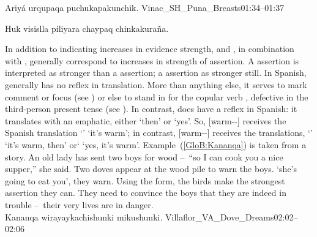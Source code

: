 %
{Ariyá urqupaqa puchukapakunchik.}%
{}%
{Vinac\_SH\_Puna\_Breasts}{01:34--01:37}%

%
{Huk visislla piliyara chaypaq chinkakuraña.}%
{}%
{}{}%

In addition to indicating increases in evidence strength,  and , in combination with , generally correspond to increases in strength of assertion. A  assertion is interpreted as stronger than a  assertion; a  assertion as stronger still. In Spanish,  generally has no reflex in translation. More than anything else, it serves to mark comment or focus (see ) or else to stand in for the copular verb , defective in the third-person present tense (see ). In contrast,  does have a reflex in Spanish: it translates with an emphatic, either  ‘then’ or  ‘yes’. So,  [warm--\uo{}] receives the Spanish translation ‘’ ‘it’s warm’; in contrast,  [warm--] receives the translations, ‘’ ‘it’s warm, then’ or‘ ‘yes, it’s warm’. Example~(\ref{GloB:Kananqa}) is taken from a story. An old lady has sent two boys for wood --~“so I can cook you a nice supper,” she said. Two doves appear at the wood pile to warn the boys.  ‘she’s going to eat you’, they warn. Using the  form, the birds make the strongest assertion they can. They need to convince the boys that they are indeed in trouble --~their very lives are in danger.\\

%
{Kananqa wirayaykachishunki mikushunki.}%
{}%
{Villaflor\_VA\_Dove\_Dreams}{02:02--02:06}%


